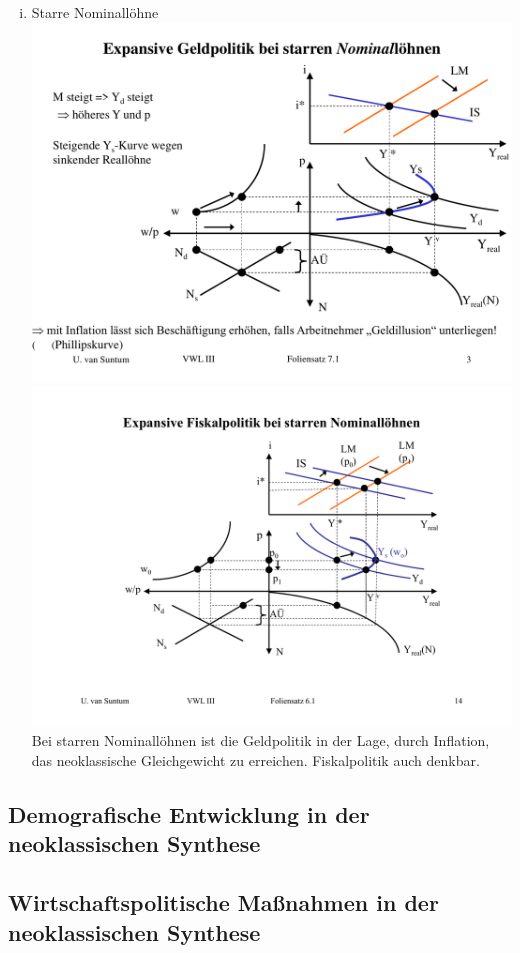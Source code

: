 \documentclass{scrartcl}
\begin{document}
\begin{enumerate}[(a)]
\begin{enumerate}[(i)]
\item Starre Nominall\"{o}hne\\ \includegraphics[width=\textwidth]{Bilder/Neoklassische_Synthese_Fix_Lohn_Geld.pdf}\\
    \includegraphics[width=\textwidth]{Bilder/Neoklassische_Synthese_Fix_Lohn_Fiskal.pdf}\\
Bei starren Nominall\"{o}hnen ist die Geldpolitik in der Lage, durch Inflation, das neoklassische Gleichgewicht zu erreichen. Fiskalpolitik auch denkbar.
\end{enumerate}
\end{enumerate}

\subsection{Demografische Entwicklung in der neoklassischen Synthese}

\subsection{Wirtschaftspolitische Ma{\ss}nahmen in der neoklassischen Synthese}
\end{document}
